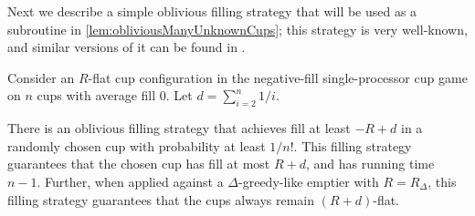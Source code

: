 
Next we describe a simple oblivious filling strategy that will be used as a
subroutine in \cref{lem:obliviousManyUnknownCups}; this strategy is very
well-known, and similar versions of it can be found in
\cite{ mbe19, mbe15, die91, wku20}.
\begin{proposition}
  \label{prop:obliviousTerribleProbability}
  Consider an $R$-flat cup configuration in the negative-fill
  single-processor cup game on $n$ cups with average fill $0$.
  Let $d = \sum_{i=2}^n 1/i$.

  There is an oblivious filling strategy that achieves fill at
  least $-R + d$ in a randomly chosen cup with probability at
  least $1/n!$. This filling strategy guarantees that the chosen
  cup has fill at most $R + d$, and has running time $n-1$.
  Further, when applied against a $\Delta$-greedy-like emptier
  with $R = R_\Delta$, this filling strategy guarantees that
  the cups always remain $(R + d)$-flat.
\end{proposition}
